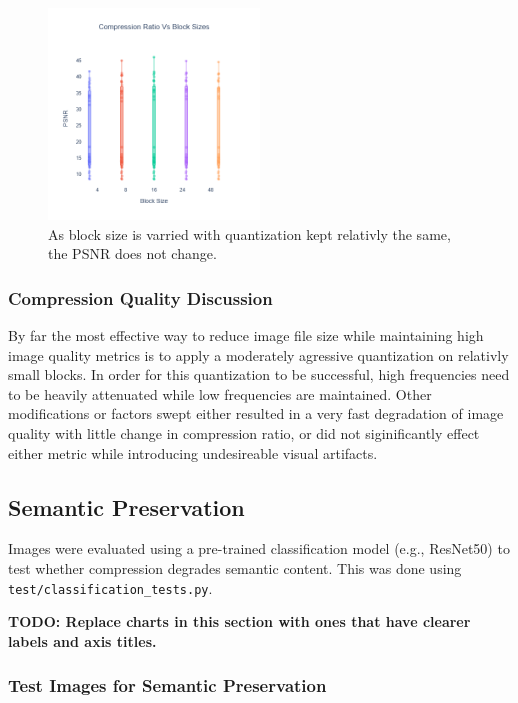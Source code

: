 \begin{figure}
    \includegraphics[width=0.5\textwidth]{assets/Block Size Vs PSNR.png}
    \caption{As block size is varried with quantization kept relativly the same, the PSNR does not change.}
\end{figure}

\subsubsection{Compression Quality Discussion}

By far the most effective way to reduce image file size while maintaining high image quality metrics is to apply a moderately agressive quantization on relativly small blocks. In order for this quantization to be successful, high frequencies need to be heavily attenuated while low frequencies are maintained. Other modifications or factors swept either resulted in a very fast degradation of image quality with little change in compression ratio, or did not siginificantly effect either metric while introducing undesireable visual artifacts.

\subsection{Semantic Preservation}
Images were evaluated using a pre-trained classification model (e.g., ResNet50) to test whether compression degrades semantic content. This was done using \texttt{test/classification\_tests.py}.

\textbf{TODO: Replace charts in this section with ones that have clearer labels and axis titles.}

\subsubsection{Test Images for Semantic Preservation}

